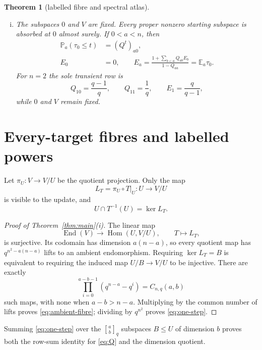 \documentclass[a4paper,10pt]{amsart}
\newtheorem{theorem}{Theorem}
\theoremstyle{remark}
\newcommand{\E}{\mathbb E}
\newcommand{\Prb}{\mathbb P}
\newcommand{\End}{\operatorname{End}}
\newcommand{\Hom}{\operatorname{Hom}}
\newcommand{\qbinom}[2]{\genfrac{[}{]}{0pt}{}{#1}{#2}_{q}}
\begin{document}
\begin{theorem}[labelled fibre and spectral atlas]
\begin{enumerate}[(i)]
\item The subspaces $0$ and $V$ are fixed.  Every proper nonzero starting
subspace is absorbed at $0$ almost surely.  If $0<a<n$, then
\begin{align}
 \Prb_a(\tau_0\le t)&=(Q^t)_{a0},                       \label{eq:cdf}\\
 E_0&=0,\qquad
 E_a=\frac{1+\sum_{b<a}Q_{ab}E_b}{1-Q_{aa}}=\E_a\tau_0.
                                                               \label{eq:mean}
\end{align}
For $n=2$ the sole transient row is
\begin{equation}\label{eq:n2}
 Q_{10}=\frac{q-1}{q},\qquad Q_{11}=\frac1q,
 \qquad E_1=\frac q{q-1},
\end{equation}
while $0$ and $V$ remain fixed.
\end{enumerate}
\end{theorem}

\section{Every-target fibres and labelled powers}

Let $\pi_U:V\to V/U$ be the quotient projection.  Only the map
\begin{equation}\label{eq:leak-map}
 L_T=\pi_U\circ T|_U:U\longrightarrow V/U
\end{equation}
is visible to the update, and
\begin{equation}\label{eq:kernel}
                  U\cap T^{-1}(U)=\ker L_T.
\end{equation}

\begin{proof}[Proof of Theorem~\ref{thm:main}(i)]
The linear map
\[
 \End(V)\longrightarrow\Hom(U,V/U),\qquad T\longmapsto L_T,
\]
is surjective.  Its codomain has dimension $a(n-a)$, so every quotient map
has $q^{n^2-a(n-a)}$ lifts to an ambient endomorphism.  Requiring
$\ker L_T=B$ is equivalent to requiring the induced map
$U/B\to V/U$ to be injective.  There are exactly
\[
 \prod_{i=0}^{a-b-1}(q^{n-a}-q^i)=C_{n,q}(a,b)
\]
such maps, with none when $a-b>n-a$.  Multiplying by the common number of
lifts proves \eqref{eq:ambient-fibre}; dividing by $q^{n^2}$ proves
\eqref{eq:one-step}.
\end{proof}

Summing \eqref{eq:one-step} over the $\qbinom ab$ subspaces $B\le U$ of
dimension $b$ proves both the row-sum identity for \eqref{eq:Q} and the
dimension quotient.
\end{document}
